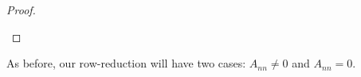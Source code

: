 \begin{proof}
\begin{itemize}
        \qedhere
    \end{itemize}
\end{proof}
As before, our row-reduction will have two cases: $A_{nn}\ne0$ and $A_{nn}=0$.
